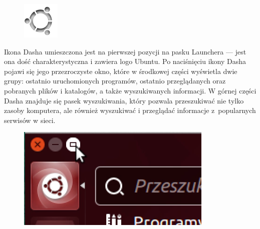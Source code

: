 \begin{figure}
	\vspace{-10pt}
	\includegraphics[width=\linewidth]{images/ikony_dash.png}
\end{figure}

Ikona Dasha umieszczona jest na pierwszej pozycji na pasku Launchera --- jest ona dość charakterystyczna i zawiera logo Ubuntu. Po naciśnięciu ikony Dasha pojawi się jego przezroczyste okno, które w środkowej części wyświetla dwie grupy: ostatnio uruchomionych programów, ostatnio przeglądanych oraz pobranych plików i katalogów, a także wyszukiwanych informacji. W górnej części Dasha znajduje się pasek wyszukiwania, który pozwala przeszukiwać nie tylko zasoby komputera, ale również wyszukiwać i przeglądać informacje z~popularnych serwisów w sieci. 

\begin{figure}
	\includegraphics[width=\linewidth]{images/unity_dash_max.png}
\end{figure}

